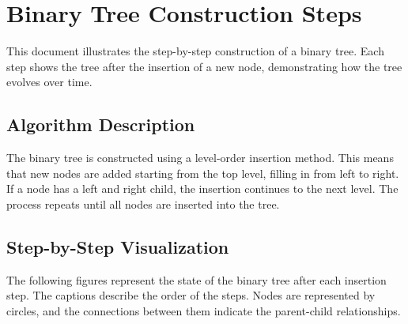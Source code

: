 \documentclass[10pt,a4paper]{article}
\begin{document}
\section*{Binary Tree Construction Steps}
This document illustrates the step-by-step construction of a binary tree. Each step shows the tree after the insertion of a new node, demonstrating how the tree evolves over time.

\subsection*{Algorithm Description}
The binary tree is constructed using a level-order insertion method. This means that new nodes are added starting from the top level, filling in from left to right. If a node has a left and right child, the insertion continues to the next level. The process repeats until all nodes are inserted into the tree.

\subsection*{Step-by-Step Visualization}
The following figures represent the state of the binary tree after each insertion step. The captions describe the order of the steps. Nodes are represented by circles, and the connections between them indicate the parent-child relationships.
\end{document}
